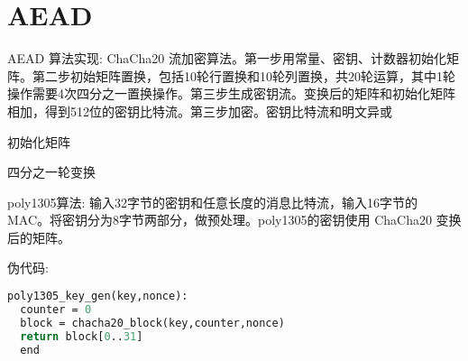 \section{AEAD}
\label{sec:B}

AEAD 算法实现: ChaCha20 流加密算法。第一步用常量、密钥、计数器初始化矩阵。第二步初始矩阵置换，包括10轮行置换和10轮列置换，共20轮运算，其中1轮操作需要4次四分之一置换操作。第三步生成密钥流。变换后的矩阵和初始化矩阵相加，得到512位的密钥比特流。第三步加密。密钥比特流和明文异或

初始化矩阵


四分之一轮变换


poly1305算法: 输入32字节的密钥和任意长度的消息比特流，输入16字节的 MAC。将密钥分为8字节两部分，做预处理。poly1305的密钥使用 ChaCha20 变换后的矩阵。

伪代码:
\begin{lstlisting}[language=perl,xleftmargin=2em,framexleftmargin=1.5em]
poly1305_key_gen(key,nonce):
  counter = 0
  block = chacha20_block(key,counter,nonce)
  return block[0..31]
  end
\end{lstlisting}

\newpage